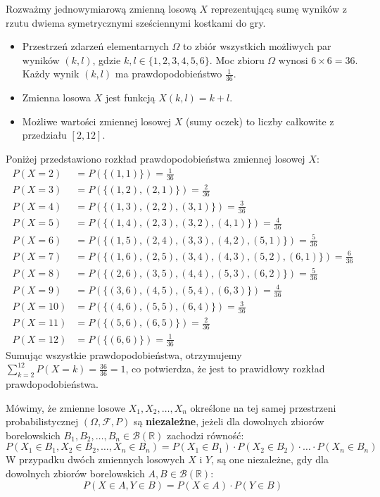 \documentclass[final,a4paper,openany,12pt]{mwbk}
\begin{document}
\begin{Prz}
Rozważmy jednowymiarową zmienną losową $X$ reprezentującą sumę wyników z rzutu dwiema symetrycznymi sześciennymi kostkami do gry.
\begin{itemize}
    \item Przestrzeń zdarzeń elementarnych $\Omega$ to zbiór wszystkich możliwych par wyników $(k, l)$, gdzie $k,l \in \{1, 2, 3, 4, 5, 6\}$.
    Moc zbioru $\Omega$ wynosi $6 \times 6 = 36$. Każdy wynik $(k,l)$ ma prawdopodobieństwo $\frac{1}{36}$.
    \item Zmienna losowa $X$ jest funkcją $X(k,l) = k+l$.
    \item Możliwe wartości zmiennej losowej $X$ (sumy oczek) to liczby całkowite z przedziału $[2, 12]$.
\end{itemize}

Poniżej przedstawiono rozkład prawdopodobieństwa zmiennej losowej $X$:
\begin{align*}
P(X=2)   &= P(\{(1,1)\}) = \frac{1}{36} \\
P(X=3)   &= P(\{(1,2), (2,1)\}) = \frac{2}{36} \\
P(X=4)   &= P(\{(1,3), (2,2), (3,1)\}) = \frac{3}{36} \\
P(X=5)   &= P(\{(1,4), (2,3), (3,2), (4,1)\}) = \frac{4}{36} \\
P(X=6)   &= P(\{(1,5), (2,4), (3,3), (4,2), (5,1)\}) = \frac{5}{36} \\
P(X=7)   &= P(\{(1,6), (2,5), (3,4), (4,3), (5,2), (6,1)\}) = \frac{6}{36} \\
P(X=8)   &= P(\{(2,6), (3,5), (4,4), (5,3), (6,2)\}) = \frac{5}{36} \\
P(X=9)   &= P(\{(3,6), (4,5), (5,4), (6,3)\}) = \frac{4}{36} \\
P(X=10)  &= P(\{(4,6), (5,5), (6,4)\}) = \frac{3}{36} \\
P(X=11)  &= P(\{(5,6), (6,5)\}) = \frac{2}{36} \\
P(X=12)  &= P(\{(6,6)\}) = \frac{1}{36}
\end{align*}
Sumując wszystkie prawdopodobieństwa, otrzymujemy $\sum_{k=2}^{12} P(X=k) = \frac{36}{36} = 1$, co potwierdza, że jest to prawidłowy rozkład prawdopodobieństwa.
\end{Prz}

\begin{Def}
Mówimy, że zmienne losowe $X_1, X_2, \dots, X_n$ określone na tej samej przestrzeni probabilistycznej $(\Omega, \mathcal{F}, P)$ są \textbf{niezależne}, jeżeli dla dowolnych zbiorów borelowskich $B_1, B_2, \dots, B_n \in \mathcal{B}(\mathbb{R})$ zachodzi równość:
$$
P(X_1 \in B_1, X_2 \in B_2, \dots, X_n \in B_n) = P(X_1 \in B_1) \cdot P(X_2 \in B_2) \cdot \dots \cdot P(X_n \in B_n)
$$
W przypadku dwóch zmiennych losowych $X$ i $Y$, są one niezależne, gdy dla dowolnych zbiorów borelowskich $A, B \in \mathcal{B}(\mathbb{R})$:
$$
P(X \in A, Y \in B) = P(X \in A) \cdot P(Y \in B)
$$
\end{Def}
\end{document}
